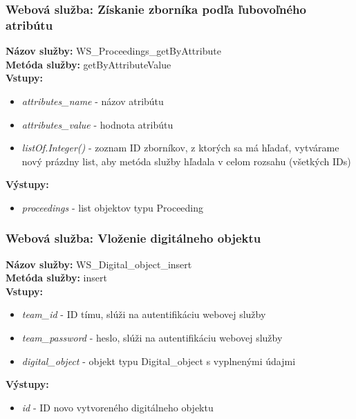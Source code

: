 \documentclass[10pt,oneside,slovak,a4paper]{article}
\begin{document}
\subsubsection{Webová služba: Získanie zborníka podľa ľubovoľného atribútu}
\textbf{Názov služby:} WS\_Proceedings\_getByAttribute\\
\textbf{Metóda služby:} getByAttributeValue\\
\textbf{Vstupy:}
	\begin{itemize}
		\item \textit{attributes\_name} - názov atribútu
		\item \textit{attributes\_value} - hodnota atribútu
		\item \textit{listOf.Integer()} - zoznam ID zborníkov, z ktorých sa má hľadať, vytvárame nový prázdny list, aby metóda služby hľadala v celom rozsahu (všetkých IDs)
	\end{itemize}
\textbf{Výstupy:}
	\begin{itemize}
		\item \textit{proceedings} - list objektov typu Proceeding
	\end{itemize}
	
\subsubsection{Webová služba: Vloženie digitálneho objektu}
\textbf{Názov služby:} WS\_Digital\_object\_insert\\
\textbf{Metóda služby:} insert\\
\textbf{Vstupy:}
	\begin{itemize}
		\item \textit{team\_id} - ID tímu, slúži na autentifikáciu webovej služby
		\item \textit{team\_password} - heslo, slúži na autentifikáciu webovej služby
		\item \textit{digital\_object} - objekt typu Digital\_object s vyplnenými údajmi
	\end{itemize}
\textbf{Výstupy:}
	\begin{itemize}
		\item \textit{id} - ID novo vytvoreného digitálneho objektu
	\end{itemize}
	
\end{document}

